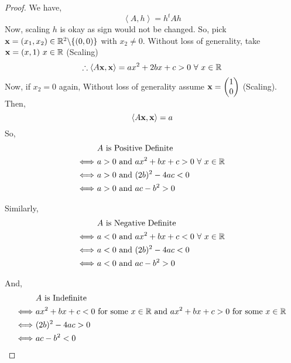 \documentclass[../Analysis-3.tex]{subfiles}
\begin{document}
\begin{proof}
  We have, \[ \left\langle A, h \right\rangle = h^tAh \]
  Now, scaling $h$ is okay as sign would not be changed. So, pick ${\bf x} = (x_1, x_2) \in \mathbb{R}^2 \backslash \{(0,0)\} $ with $x_2 \neq 0$.
  Without loss of generality, take ${\bf x} = (x,1) \ x \in \mathbb{R}$ (Scaling) \\
  \[ \therefore \left\langle A\bf{x}, \bf{x} \right\rangle = ax^2 + 2bx + c > 0 \ \forall\ x \in \mathbb{R} \]
  Now, if $x_2 = 0$ again, Without loss of generality assume ${\bf x} = \begin{pmatrix}
      1 \\
      0
    \end{pmatrix}$ (Scaling). Then, \[ \left\langle A\bf{x}, \bf{x} \right\rangle = a \]
  So,
  \begin{align*}
                        & \ A \text{ is Positive Definite}                         \\
    \Longleftrightarrow & \ a > 0 \text{ and } ax^2 + bx+c > 0 \ \forall\ x \in \mathbb{R} \\
    \Longleftrightarrow & \ a > 0 \text{ and } (2b)^2 - 4ac < 0                    \\
    \Longleftrightarrow & \ a > 0 \text{ and } ac - b^2 > 0
  \end{align*}

  Similarly,
  \begin{align*}
                        & \ A \text{ is Negative Definite}                         \\
    \Longleftrightarrow & \ a < 0 \text{ and } ax^2 + bx+c < 0 \ \forall\ x \in \mathbb{R} \\
    \Longleftrightarrow & \ a < 0 \text{ and } (2b)^2 - 4ac < 0                    \\
    \Longleftrightarrow & \ a < 0 \text{ and } ac - b^2 > 0
  \end{align*}

  And,
  \begin{align*}
                        & \ A \text{ is Indefinite}                                                                              \\
    \Longleftrightarrow & \ ax^2 + bx+c < 0 \ \text{for some } x \in \mathbb{R} \text{ and } ax^2 + bx+c > 0 \ \text{for some } x \in \mathbb{R} \\
    \Longleftrightarrow & \ (2b)^2 - 4ac > 0                                                                                     \\
    \Longleftrightarrow & \ ac - b^2 < 0
  \end{align*}
\end{proof}
\end{document}
